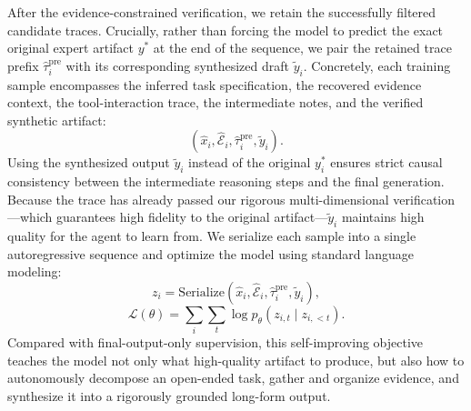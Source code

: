 After the evidence-constrained verification, we retain the successfully filtered candidate traces. Crucially, rather than forcing the model to predict the exact original expert artifact $y^*$ at the end of the sequence, we pair the retained trace prefix $\hat{\tau}^{\mathrm{pre}}_i$ with its corresponding synthesized draft $\tilde{y}_i$. Concretely, each training sample encompasses the inferred task specification, the recovered evidence context, the tool-interaction trace, the intermediate notes, and the verified synthetic artifact:\begin{equation}(\hat{x}_i, \hat{\mathcal{E}}_i, \hat{\tau}^{\mathrm{pre}}_i, \tilde{y}_i).\end{equation}Using the synthesized output $\tilde{y}_i$ instead of the original $y_i^*$ ensures strict causal consistency between the intermediate reasoning steps and the final generation. Because the trace has already passed our rigorous multi-dimensional verification—which guarantees high fidelity to the original artifact—$\tilde{y}_i$ maintains high quality for the agent to learn from.
We serialize each sample into a single autoregressive sequence and optimize the model using standard language modeling:
\begin{equation}
z_i = \mathrm{Serialize}(\hat{x}_i, \hat{\mathcal{E}}_i, \hat{\tau}^{\mathrm{pre}}_i, \tilde{y}_i),
\end{equation}
\begin{equation}
\mathcal{L}(\theta)=\sum_i \sum_t\log p_\theta(z_{i,t} \mid z_{i,<t}).\end{equation}
Compared with final-output-only supervision, this self-improving objective teaches the model not only what high-quality artifact to produce, but also how to autonomously decompose an open-ended task, gather and organize evidence, and synthesize it into a rigorously grounded long-form output.